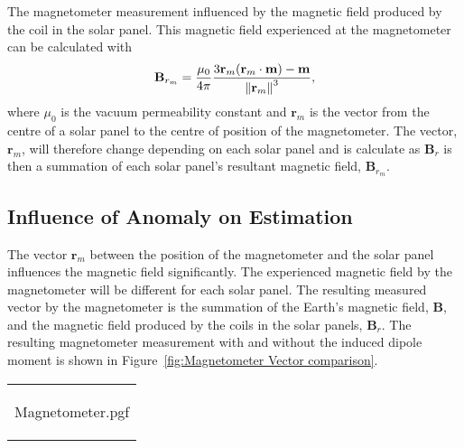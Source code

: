 The magnetometer measurement influenced by the magnetic field produced by the coil in the solar panel. This magnetic field experienced at the magnetometer can be calculated with 
\begin{equation}
\mathbf{B}_{r_m} = \frac{\mu_0}{4\pi} \frac{3 \mathbf{r}_m (\mathbf{r}_m \cdot \mathbf{m}) - \mathbf{m}}{\left\lVert\mathbf{r}_m\right\rVert^3},
\end{equation}
where $\mu_0$ is the vacuum permeability constant and $\mathbf{r}_m$ is the vector from the centre of a solar panel to the centre of position of the magnetometer. The vector, $\mathbf{r}_m$, will therefore change depending on each solar panel and is calculate as $\mathbf{B}_r$ is then a summation of each solar panel's resultant magnetic field, $\mathbf{B}_{r_m}$. 

\subsection{Influence of Anomaly on Estimation}
The vector $\mathbf{r}_m$ between the position of the magnetometer and the solar panel influences the magnetic field significantly. The experienced magnetic field by the magnetometer will be different for each solar panel. The resulting measured vector by the magnetometer is the summation of the Earth's magnetic field, $\mathbf{B}$, and the magnetic field produced by the coils in the solar panels, $\mathbf{B}_r$. The resulting magnetometer measurement with and without the induced dipole moment is shown in Figure~\ref{fig:Magnetometer Vector comparison}. 

\begin{figure*}[!htb]
	\begin{tabular}{@{}c@{}}
		\centering
		
		{Magnetometer.pgf}
		
		\label{fig:Magnetic field Vector comparison with solar Panel magnetic field}
	\end{tabular}
%	
	\caption{Comparison of Magnetic field Vector with and without solar Panel magnetic field}
	\label{fig:Magnetometer Vector comparison}
\end{figure*}

